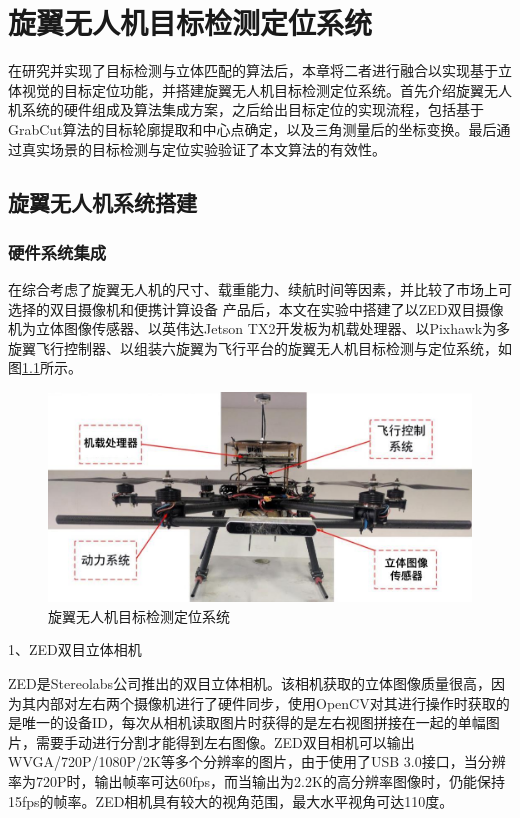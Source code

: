 
\chapter{旋翼无人机目标检测定位系统}
在研究并实现了目标检测与立体匹配的算法后，本章将二者进行融合以实现基于立体视觉的目标定位功能，并搭建旋翼无人机目标检测定位系统。首先介绍旋翼无人机系统的硬件组成及算法集成方案，之后给出目标定位的实现流程，包括基于GrabCut算法的目标轮廓提取和中心点确定，以及三角测量后的坐标变换。最后通过真实场景的目标检测与定位实验验证了本文算法的有效性。

\section{旋翼无人机系统搭建}
\subsection{硬件系统集成}
在综合考虑了旋翼无人机的尺寸、载重能力、续航时间等因素，并比较了市场上可选择的双目摄像机和便携计算设备
产品后，本文在实验中搭建了以ZED双目摄像机为立体图像传感器、以英伟达Jetson TX2开发板为机载处理器、以Pixhawk为多旋翼飞行控制器、以组装六旋翼为飞行平台的旋翼无人机目标检测与定位系统，如图\ref{fig:5_1_旋翼无人机目标检测定位系统}所示。

\begin{figure}[htb] %
	\centering
	\includegraphics[width=5.5in]{figures/5_平台介绍/旋翼无人机目标检测定位系统}
	\caption{旋翼无人机目标检测定位系统}\label{fig:5_1_旋翼无人机目标检测定位系统}
\end{figure}

1、ZED双目立体相机

ZED是Stereolabs公司推出的双目立体相机。该相机获取的立体图像质量很高，因为其内部对左右两个摄像机进行了硬件同步，使用OpenCV对其进行操作时获取的是唯一的设备ID，每次从相机读取图片时获得的是左右视图拼接在一起的单幅图片，需要手动进行分割才能得到左右图像。ZED双目相机可以输出WVGA/720P/1080P/2K等多个分辨率的图片，由于使用了USB 3.0接口，当分辨率为720P时，输出帧率可达60fps，而当输出为2.2K的高分辨率图像时，仍能保持15fps的帧率。ZED相机具有较大的视角范围，最大水平视角可达110度。

